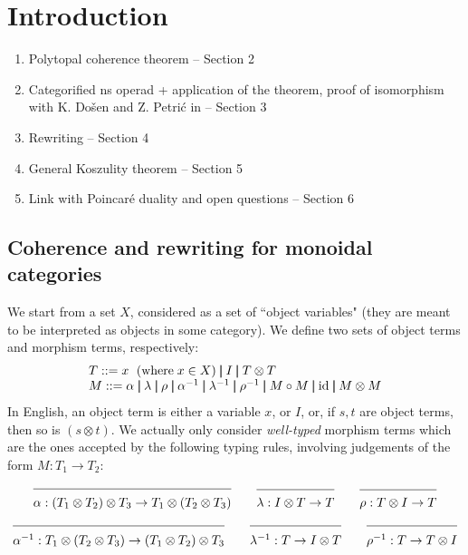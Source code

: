 
\section{Introduction} 
\label{s:introduction}


\begin{enumerate}

    \item Polytopal coherence theorem -- Section 2

    \item Categorified ns operad + application of the theorem, proof of isomorphism with K. Do{\v s}en and Z. Petri{\'c} in \cite{DP15} -- Section 3

    \item Rewriting -- Section 4
    
    \item General Koszulity theorem -- Section 5

    \item Link with Poincar\'e duality and open questions -- Section 6

\end{enumerate}




\subsection{Coherence and rewriting for monoidal categories}

We start from a set $X$, considered as a set of  ``object variables"  (they are meant to be interpreted as objects in some category).  We define two sets   of object terms and morphism terms, respectively:
$$\begin{array}{l}
T::= x\  \;(\mbox{where}\;x\in X) \Alt I \Alt T\otimes T\\
M ::= \alpha \Alt \lambda \Alt\rho\Alt  \alpha^{-1} \Alt \lambda^{-1} \Alt\rho^{-1} \Alt M\comp M\Alt \id\Alt M\otimes M
\end{array}$$
In English, an object term is either a variable $x$, or $I$, or, if $s,t$ are object terms, then so is $(s\otimes t)$.
We actually only consider {\em well-typed} morphism terms  which are the ones accepted by the following typing rules, involving judgements of the form $M:T_1\rightarrow T_2$:
$$\seq{}{\alpha:(T_1\otimes T_2)\otimes T_3\rightarrow T_1\otimes(T_2\otimes T_3)}\quad\quad
\seq{}{\lambda:I\otimes T\rightarrow T}\quad\quad\seq{}{\rho:T\otimes I\rightarrow T}$$
$$\seq{}{\alpha^{-1}:T_1\otimes(T_2\otimes T_3)\rightarrow (T_1\otimes T_2)\otimes T_3}\quad\quad
\seq{}{\lambda^{-1}: T\rightarrow I\otimes T}\quad\quad\seq{}{\rho^{-1}:T\rightarrow T\otimes I}$$

